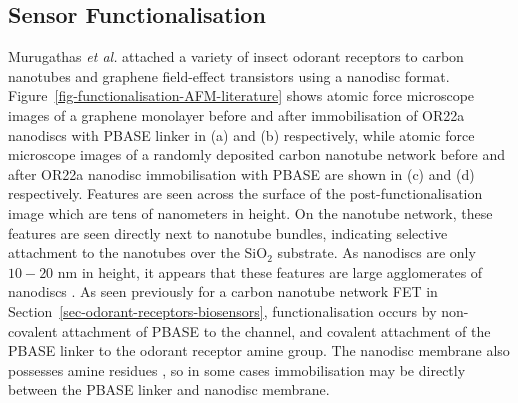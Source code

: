 \documentclass[
  a4paper,
]{scrbook}
\begin{document}
\hypertarget{sensor-functionalisation}{%
\subsection{Sensor Functionalisation}\label{sensor-functionalisation}}

Murugathas \emph{et al.} attached a variety of insect odorant receptors
to carbon nanotubes and graphene field-effect transistors using a
nanodisc format. Figure~\ref{fig-functionalisation-AFM-literature} shows
atomic force microscope images of a graphene monolayer before and after
immobilisation of OR22a nanodiscs with PBASE linker in (a) and (b)
respectively, while atomic force microscope images of a randomly
deposited carbon nanotube network before and after OR22a nanodisc
immobilisation with PBASE are shown in (c) and (d) respectively.
Features are seen across the surface of the post-functionalisation image
which are tens of nanometers in height. On the nanotube network, these
features are seen directly next to nanotube bundles, indicating
selective attachment to the nanotubes over the SiO\(_2\) substrate. As
nanodiscs are only \(10 - 20\) nm in height, it appears that these
features are large agglomerates of nanodiscs
\autocite{Nath2007,Bayburt2010,Murugathas2019a,Murugathas2020}. As seen
previously for a carbon nanotube network FET in
Section~\ref{sec-odorant-receptors-biosensors}, functionalisation occurs
by non-covalent attachment of PBASE to the channel, and covalent
attachment of the PBASE linker to the odorant receptor amine group. The
nanodisc membrane also possesses amine residues \autocite{Bayburt2010},
so in some cases immobilisation may be directly between the PBASE linker
and nanodisc membrane.
\end{document}
